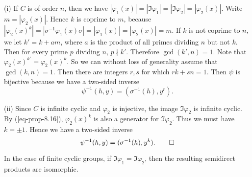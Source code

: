 \begin{sketch}
 	(i) If $C$ is of order $n$, then we have $|\varphi_1(x)| = |\Im \varphi_1| = |\Im \varphi_2|= |\varphi_2(x)|$. Write $m = |\varphi_2(x)|$.  Hence $k$ is coprime to $m$, because $|\varphi_2(x)^k| = |\sigma^{-1}\varphi_1(x)\sigma| = |\varphi_1(x)| = |\varphi_2(x)| = m$. If $k$ is not coprime to $n$, we let $k' = k + am$, where $a$ is the product of all primes dividing $n$ but not $k$. Then for every prime $p$ dividing $n$, $p\nmid k'$. Therefore $\gcd(k',n) = 1$. Note that $\varphi_2(x)^{k'} = \varphi_2(x)^k$. So we can without loss of generality assume that $\gcd(k,n)=1$.  Then there are integers $r,s$ for which $rk+sn = 1$. Then $\psi$ is bijective because we have a two-sided inverse 
 	\begin{equation*}
 		\psi^{-1}(h,y) = (\sigma^{-1}(h),y^r).
 	\end{equation*}
 	
 	(ii) Since $C$ is infinite cyclic and $\varphi_2$ is injective, the image $\Im  \varphi_2$ is infinite cyclic. By (\ref{eq-prop-8.16}), $\varphi_2(x)^k$ is also a generator for $\Im  \varphi_2$. Thus we must have $k = \pm 1$. Hence we have a two-sided inverse
 	\begin{equation*}
 		\psi^{-1}(h,y) = (\sigma^{-1}(h),y^k). \qedhere
 	\end{equation*}
\end{sketch}
\begin{remark}
	In the case of finite cyclic groups, if  $\Im \varphi_1 = \Im \varphi_2$, then the resulting semidirect products are isomorphic.
\end{remark}
